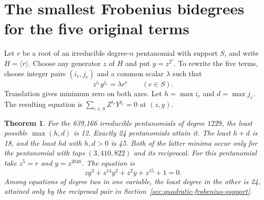 \documentclass[11pt]{article}
\newtheorem{theorem}{Theorem}
\begin{document}
\section{The smallest Frobenius bidegrees for the five original terms}
\label{sec:sparse-frobenius-boxes}
Let \(r\) be a root of an irreducible degree-\(n\) pentanomial with
support \(S\), and write \(H=\langle r\rangle\). Choose any generator
\(z\) of \(H\) and put \(y=z^{2^s}\). To rewrite the five terms, choose
integer pairs \((i_e,j_e)\) and a common scalar \(\lambda\) such that
\[
                   z^{i_e}y^{j_e}=\lambda r^e\qquad(e\in S).
\]
Translation gives minimum zero on both axes. Let \(h=\max i_e\) and
\(d=\max j_e\). The resulting equation is
\(\sum_{e\in S} Z^{i_e}Y^{j_e}=0\) at \((z,y)\).

\begin{theorem}
For the 639,166 irreducible pentanomials of degree \(1229\), the least
possible \(\max(h,d)\) is 12. Exactly 24 pentanomials attain it.
The least \(h+d\) is 18, and the least \(hd\) with \(h,d>0\) is 45.
Both of the latter minima occur only for the pentanomial with taps
\((3,410,822)\) and its reciprocal. For this pentanomial take
\(z^5=r\) and \(y=z^{2048}\). The equation is
\[
                  zy^3+z^{14}y^2+z^2y+z^{15}+1=0.
\]
Among equations of degree two in one variable, the least degree in the
other is 24, attained only by the reciprocal pair in
Section~\ref{sec:quadratic-frobenius-support}.
\end{theorem}
\end{document}
